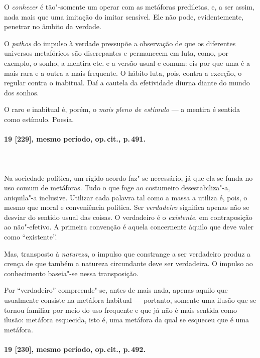 O \textit{conhecer} é tão"-somente um operar com as metáforas prediletas, e,
a ser assim, nada mais que uma imitação do imitar sensível. Ele não
pode, evidentemente, penetrar no âmbito da verdade.

O \textit{pathos} do impulso à verdade pressupõe a observação de que os
diferentes universos metafóricos são discrepantes e permanecem em luta,
como, por exemplo, o sonho, a mentira etc. e a versão usual e comum:
eis por que uma é a mais rara e a outra a mais frequente. O hábito
luta, pois, contra a exceção, o regular contra o inabitual. Daí a
cautela da efetividade diurna diante do mundo dos sonhos. 

O raro e inabitual é, porém, o \textit{mais pleno de estímulo} --- a
mentira é sentida como estímulo. Poesia. 

\pagebreak
\paragraph*{19 [229], mesmo período, op.\,cit., p.\,491.}
\ \\
\ \\

Na sociedade política, um rígido acordo faz"-se necessário, já que ela
se funda no uso comum de metáforas. Tudo o que foge ao costumeiro
desestabiliza"-a, aniquila"-a inclusive. Utilizar cada palavra tal
como a massa a utiliza é, pois, o mesmo que moral e conveniência
política. Ser \textit{verdadeiro} significa apenas não se desviar do
sentido usual das coisas. O verdadeiro é o \textit{existente}, em
contraposição ao não"-efetivo. A primeira convenção é aquela
concernente àquilo que deve valer como “existente”.

Mas, transposto à \textit{natureza}, o impulso que constrange a ser
verdadeiro produz a crença de que também a natureza circundante deve
ser verdadeira. O impulso ao conhecimento baseia"-se nessa
transposição.

Por “verdadeiro” compreende"-se, antes de mais nada, apenas aquilo que
usualmente consiste na metáfora habitual --- portanto, somente uma ilusão
que se tornou familiar por meio do uso frequente e que já não é mais
sentida como ilusão: metáfora esquecida, isto é, uma metáfora da qual
se esqueceu que é uma metáfora.

\pagebreak
\paragraph*{19 [230], mesmo período, op.\,cit., p.\,492.}
\ \\
\ \\

